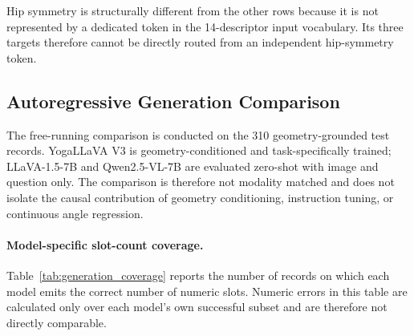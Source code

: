 Hip symmetry is structurally different from the other rows because it
is not represented by a dedicated token in the 14-descriptor input
vocabulary. Its three targets therefore cannot be directly routed from
an independent hip-symmetry token.

\subsection{Autoregressive Generation Comparison}
\label{sec:generation_comparison}

The free-running comparison is conducted on the 310
geometry-grounded test records. YogaLLaVA V3 is geometry-conditioned
and task-specifically trained; LLaVA-1.5-7B and Qwen2.5-VL-7B are
evaluated zero-shot with image and question only. The comparison is
therefore not modality matched and does not isolate the causal
contribution of geometry conditioning, instruction tuning, or
continuous angle regression.

\paragraph{Model-specific slot-count coverage.}
Table~\ref{tab:generation_coverage} reports the number of records on
which each model emits the correct number of numeric slots. Numeric
errors in this table are calculated only over each model's own
successful subset and are therefore not directly comparable.

\begin{table}[t]
    \centering
    \caption{Model-specific free-generation slot-count coverage on 310
    geometry-grounded test records. Numeric metrics are calculated on
    different model-specific successful subsets.}
    \label{tab:generation_coverage}
\end{table}

